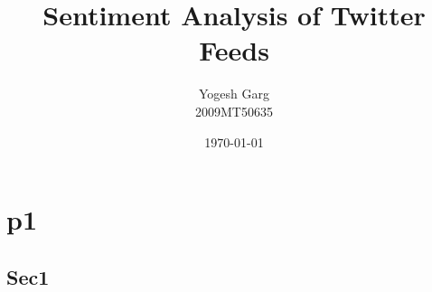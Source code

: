 \documentclass[10pt]{report}
\title{
Sentiment Analysis of Twitter Feeds
}
\author{
Yogesh Garg\\
2009MT50635
}
\date{\today}
\begin{document}
\maketitle

\tableofcontents

\chapter{p1}

\section{Sec1}
\end{document}

